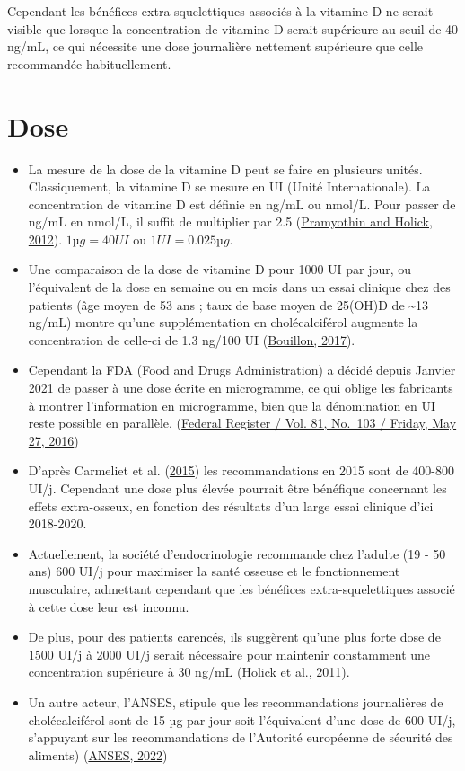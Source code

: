 \documentclass[
  a4paper,
  DIV=11,
  numbers=noendperiod,
  listof=totoc]{scrreprt}
\begin{document}
Cependant les bénéfices extra-squelettiques associés à la vitamine D ne
serait visible que lorsque la concentration de vitamine D serait
supérieure au seuil de 40 ng/mL, ce qui nécessite une dose journalière
nettement supérieure que celle recommandée habituellement.

\hypertarget{dose}{%
\section{Dose}\label{dose}}

\begin{itemize}
\item
  La mesure de la dose de la vitamine D peut se faire en plusieurs
  unités. Classiquement, la vitamine D se mesure en UI (Unité
  Internationale). La concentration de vitamine D est définie en ng/mL
  ou nmol/L. Pour passer de ng/mL en nmol/L, il suffit de multiplier par
  2.5 (\protect\hyperlink{ref-Pramyothin.2012}{Pramyothin and Holick,
  2012}). \(1 µg = 40 UI\) ou \(1 UI = 0.025 µg\).
\item
  Une comparaison de la dose de vitamine D pour 1000 UI par jour, ou
  l'équivalent de la dose en semaine ou en mois dans un essai clinique
  chez des patients (âge moyen de 53 ans ; taux de base moyen de 25(OH)D
  de \textasciitilde13 ng/mL) montre qu'une supplémentation en
  cholécalciférol augmente la concentration de celle-ci de 1.3 ng/100 UI
  (\protect\hyperlink{ref-Bouillon.2017}{Bouillon, 2017}).
\item
  Cependant la FDA (Food and Drugs Administration) a décidé depuis
  Janvier 2021 de passer à une dose écrite en microgramme, ce qui oblige
  les fabricants à montrer l'information en microgramme, bien que la
  dénomination en UI reste possible en parallèle.
  (\href{https://www.govinfo.gov/content/pkg/FR-2016-05-27/pdf/2016-11867.pdf}{Federal
  Register / Vol. 81, No.~103 / Friday, May 27, 2016})
\item
  D'après Carmeliet et al.
  (\protect\hyperlink{ref-Carmeliet.2015}{2015}) les recommandations en
  2015 sont de 400-800 UI/j. Cependant une dose plus élevée pourrait
  être bénéfique concernant les effets extra-osseux, en fonction des
  résultats d'un large essai clinique d'ici 2018-2020.
\item
  Actuellement, la société d'endocrinologie recommande chez l'adulte (19
  - 50 ans) 600 UI/j pour maximiser la santé osseuse et le
  fonctionnement musculaire, admettant cependant que les bénéfices
  extra-squelettiques associé à cette dose leur est inconnu.
\item
  De plus, pour des patients carencés, ils suggèrent qu'une plus forte
  dose de 1500 UI/j à 2000 UI/j serait nécessaire pour maintenir
  constamment une concentration supérieure à 30 ng/mL
  (\protect\hyperlink{ref-Holick.2011}{Holick et al., 2011}).
\item
  Un autre acteur, l'ANSES, stipule que les recommandations journalières
  de cholécalciférol sont de 15 µg par jour soit l'équivalent d'une dose
  de 600 UI/j, s'appuyant sur les recommandations de l'Autorité
  européenne de sécurité des aliments)
  (\protect\hyperlink{ref-ANSES.2022}{ANSES, 2022})
\end{itemize}
\end{document}
